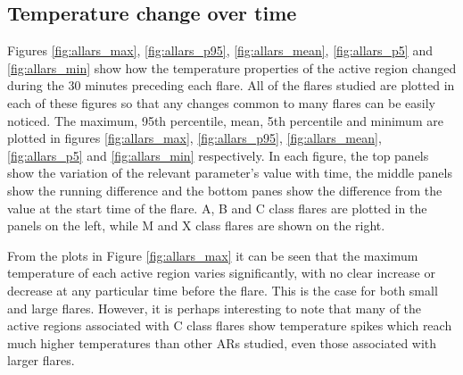 \documentclass[referee,a4paper,12pt,traditabstract]{swsc}
\begin{document}
\begin{linenumbers}
\subsection{Temperature change over time}
Figures \ref{fig:allars_max}, \ref{fig:allars_p95}, \ref{fig:allars_mean}, \ref{fig:allars_p5} and \ref{fig:allars_min} show how the temperature properties of the active region changed during the 30 minutes preceding each flare.
All of the flares studied are plotted in each of these figures so that any changes common to many flares can be easily noticed.
The maximum, 95th percentile, mean, 5th percentile and minimum are plotted in figures \ref{fig:allars_max}, \ref{fig:allars_p95}, \ref{fig:allars_mean}, \ref{fig:allars_p5} and \ref{fig:allars_min} respectively.
In each figure, the top panels show the variation of the relevant parameter's value with time, the middle panels show the running difference and the bottom panes show the difference from the value at the start time of the flare.
A, B and C class flares are plotted in the panels on the left, while M and X class flares are shown on the right. %

From the plots in Figure \ref{fig:allars_max} it can be seen that the maximum temperature of each active region varies significantly, with no clear increase or decrease at any particular time before the flare.
This is the case for both small and large flares.
However, it is perhaps interesting to note that many of the active regions associated with C class flares show temperature spikes which reach much higher temperatures than other ARs studied, even those associated with larger flares.



\end{linenumbers}
\end{document}
